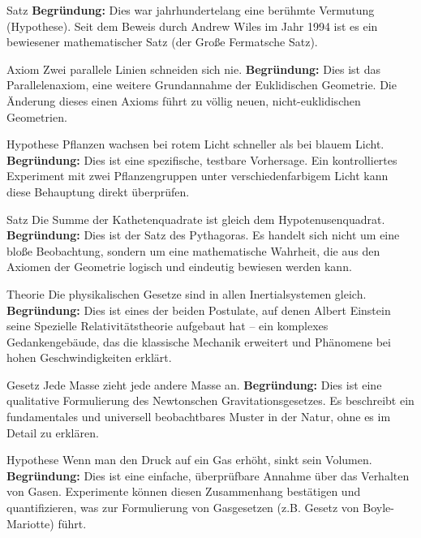 \documentclass[ngerman]{scrreprt}
\newenvironment{loesungbox}[1]
  {\needspace{5\baselineskip}\begin{loesungboxstyle}[frametitle={#1}]}
  {\end{loesungboxstyle}}
\begin{document}
\begin{loesungbox}{Lösung zu \Cref{aufg:die_physik}}
\begin{tcbraster}[raster columns=2, raster equal height=rows]
\begin{solutiontermbox}{Satz}
        \tcblower
        \textbf{Begründung:} Dies war jahrhundertelang eine berühmte Vermutung (Hypothese). Seit dem Beweis durch Andrew Wiles im Jahr 1994 ist es ein bewiesener mathematischer Satz (der Große Fermatsche Satz).
    \end{solutiontermbox}
    \begin{solutiontermbox}{Axiom}
        Zwei parallele Linien schneiden sich nie.
        \tcblower
        \textbf{Begründung:} Dies ist das Parallelenaxiom, eine weitere Grundannahme der Euklidischen Geometrie. Die Änderung dieses einen Axioms führt zu völlig neuen, nicht-euklidischen Geometrien.
    \end{solutiontermbox}
    \begin{solutiontermbox}{Hypothese}
        Pflanzen wachsen bei rotem Licht schneller als bei blauem Licht.
        \tcblower
        \textbf{Begründung:} Dies ist eine spezifische, testbare Vorhersage. Ein kontrolliertes Experiment mit zwei Pflanzengruppen unter verschiedenfarbigem Licht kann diese Behauptung direkt überprüfen.
    \end{solutiontermbox}
    \begin{solutiontermbox}{Satz}
        Die Summe der Kathetenquadrate ist gleich dem Hypotenusenquadrat.
        \tcblower
        \textbf{Begründung:} Dies ist der Satz des Pythagoras. Es handelt sich nicht um eine bloße Beobachtung, sondern um eine mathematische Wahrheit, die aus den Axiomen der Geometrie logisch und eindeutig bewiesen werden kann.
    \end{solutiontermbox}
    \begin{solutiontermbox}{Theorie}
        Die physikalischen Gesetze sind in allen Inertialsystemen gleich.
        \tcblower
        \textbf{Begründung:} Dies ist eines der beiden Postulate, auf denen Albert Einstein seine Spezielle Relativitätstheorie aufgebaut hat – ein komplexes Gedankengebäude, das die klassische Mechanik erweitert und Phänomene bei hohen Geschwindigkeiten erklärt.
    \end{solutiontermbox}
    \begin{solutiontermbox}{Gesetz}
        Jede Masse zieht jede andere Masse an.
        \tcblower
        \textbf{Begründung:} Dies ist eine qualitative Formulierung des Newtonschen Gravitationsgesetzes. Es beschreibt ein fundamentales und universell beobachtbares Muster in der Natur, ohne es im Detail zu erklären.
    \end{solutiontermbox}
    \begin{solutiontermbox}{Hypothese}
        Wenn man den Druck auf ein Gas erhöht, sinkt sein Volumen.
        \tcblower
        \textbf{Begründung:} Dies ist eine einfache, überprüfbare Annahme über das Verhalten von Gasen. Experimente können diesen Zusammenhang bestätigen und quantifizieren, was zur Formulierung von Gasgesetzen (z.B. Gesetz von Boyle-Mariotte) führt.
    \end{solutiontermbox}
\end{tcbraster}
\end{loesungbox}
\end{document}
